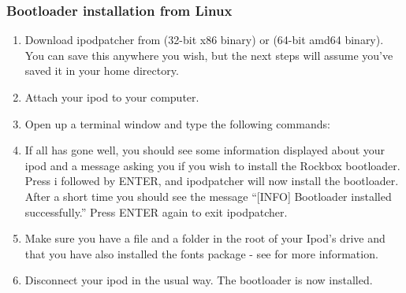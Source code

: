 \subsubsection{Bootloader installation from Linux}

\begin{enumerate} 

\item Download ipodpatcher from 
 (32-bit x86 
binary) or  
(64-bit amd64 binary). You can save this anywhere you wish, but the next 
steps will assume you've saved it in your home directory.

\item Attach your ipod to your computer.

\item Open up a terminal window and type the following commands:



\item If all has gone well, you should see some information displayed about
your ipod and a message asking you if you wish to install the Rockbox 
bootloader. Press i followed by ENTER, and ipodpatcher will now install the 
bootloader. After a short time you should see the message ``[INFO] Bootloader 
installed successfully.'' Press ENTER again to exit ipodpatcher.

\item Make sure you have a  file and a 
 folder in the 
root of your Ipod's drive and that you have also installed the fonts
package - see  for more information.

\item Disconnect your ipod in the usual way. The bootloader is now installed. 

\end{enumerate} 
